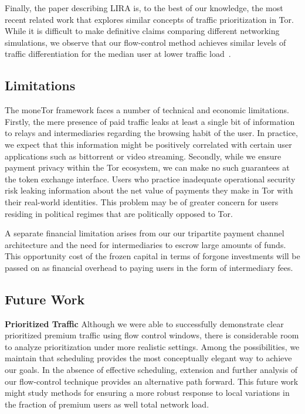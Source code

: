Finally, the paper describing LIRA is, to the best of our knowledge, the most
recent related work that explores similar concepts of traffic prioritization in
Tor. While it is difficult to make definitive claims comparing different
networking simulations, we observe that our flow-control method achieves similar
levels of traffic differentiation for the median user at lower traffic
load~\cite{jansen2013lira}.

\subsection{Limitations}

The moneTor framework faces a number of technical and economic
limitations. Firstly, the mere presence of paid traffic leaks at least a single
bit of information to relays and intermediaries regarding the browsing habit of
the user. In practice, we expect that this information might be positively
correlated with certain user applications such as bittorrent or video
streaming. Secondly, while we ensure payment privacy within the Tor ecosystem,
we can make no such guarantees at the token exchange interface. Users who
practice inadequate operational security risk leaking information about the net
value of payments they make in Tor with their real-world identities. This
problem may be of greater concern for users residing in political regimes that
are politically opposed to Tor.

A separate financial limitation arises from our our tripartite payment channel
architecture and the need for intermediaries to escrow large amounts of
funds. This opportunity cost of the frozen capital in terms of forgone
investments will be passed on as financial overhead to paying users in the form
of intermediary fees.

\subsection{Future Work}

\textbf{Prioritized Traffic} Although we were able to successfully demonstrate
clear prioritized premium traffic using flow control windows, there is
considerable room to analyze prioritization under more realistic settings. Among
the possibilities, we maintain that scheduling provides the most conceptually
elegant way to achieve our goals. In the absence of effective scheduling,
extension and further analysis of our flow-control technique provides an
alternative path forward. This future work might study methods for ensuring a
more robust response to local variations in the fraction of premium users as
well total network load.


